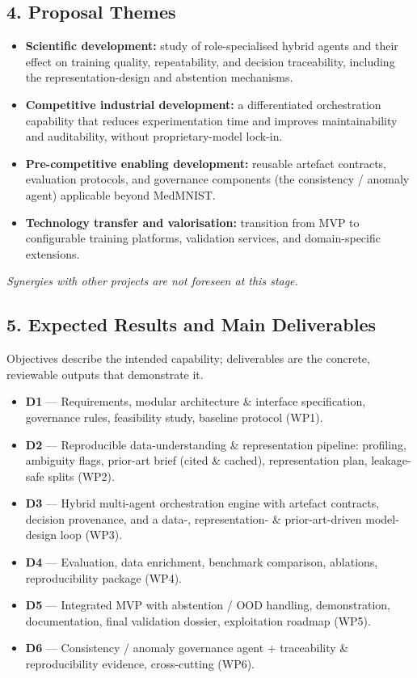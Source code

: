 \documentclass[11pt,a4paper]{article}
\begin{document}
\subsection*{4. Proposal Themes}
\begin{itemize}
\item \textbf{Scientific development:} study of role-specialised hybrid agents and their effect on training quality, repeatability, and decision traceability, including the representation-design and abstention mechanisms.
\item \textbf{Competitive industrial development:} a differentiated orchestration capability that reduces experimentation time and improves maintainability and auditability, without proprietary-model lock-in.
\item \textbf{Pre-competitive enabling development:} reusable artefact contracts, evaluation protocols, and governance components (the consistency / anomaly agent) applicable beyond MedMNIST.
\item \textbf{Technology transfer and valorisation:} transition from MVP to configurable training platforms, validation services, and domain-specific extensions.
\end{itemize}
\noindent\textit{Synergies with other projects are not foreseen at this stage.}

\subsection*{5. Expected Results and Main Deliverables}
Objectives describe the intended capability; deliverables are the concrete, reviewable outputs that demonstrate it.
\begin{itemize}
\item \textbf{D1} --- Requirements, modular architecture \& interface specification, governance rules, feasibility study, baseline protocol (WP1).
\item \textbf{D2} --- Reproducible data-understanding \& representation pipeline: profiling, ambiguity flags, prior-art brief (cited \& cached), representation plan, leakage-safe splits (WP2).
\item \textbf{D3} --- Hybrid multi-agent orchestration engine with artefact contracts, decision provenance, and a data-, representation- \& prior-art-driven model-design loop (WP3).
\item \textbf{D4} --- Evaluation, data enrichment, benchmark comparison, ablations, reproducibility package (WP4).
\item \textbf{D5} --- Integrated MVP with abstention / OOD handling, demonstration, documentation, final validation dossier, exploitation roadmap (WP5).
\item \textbf{D6} --- Consistency / anomaly governance agent + traceability \& reproducibility evidence, cross-cutting (WP6).
\end{itemize}
\end{document}

